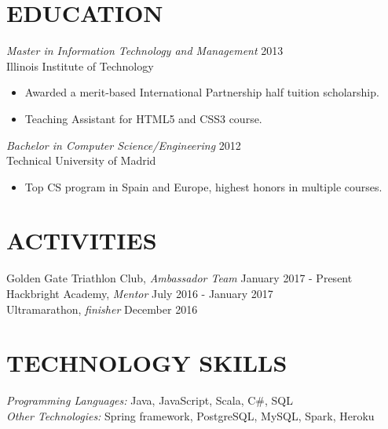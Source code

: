 \documentclass[overlapped, 10pt]{res} %
\begin{document}
\begin{resume}
 
\section{EDUCATION}\smallskip

{\sl Master in Information Technology and Management} \hfill 2013 \\
Illinois Institute of Technology
\begin{itemize}
\item Awarded a merit-based International Partnership half tuition scholarship.
\item Teaching Assistant for HTML5 and CSS3 course.
\end{itemize} 

{\sl Bachelor in Computer Science/Engineering} \hfill 2012 \\
Technical University of Madrid
\begin{itemize} \itemsep -2pt %
\item Top CS program in Spain and Europe, highest honors in multiple courses.
\end{itemize}


\section{ACTIVITIES}\smallskip

Golden Gate Triathlon Club, {\sl Ambassador Team} \hfill January 2017 - Present\\
Hackbright Academy, {\sl Mentor} \hfill July 2016 - January 2017\\
Ultramarathon, {\sl finisher} \hfill December 2016 \\


\section{TECHNOLOGY SKILLS}\smallskip

{\sl Programming Languages:} Java, JavaScript, Scala, C\#, SQL \\
{\sl Other Technologies:} Spring framework, PostgreSQL, MySQL, Spark, Heroku \\
 

\end{resume}
\end{document}
